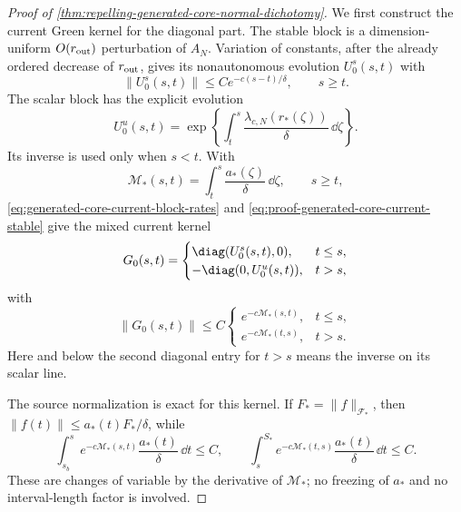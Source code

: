 \begin{proof}[Proof of
\cref{thm:repelling-generated-core-normal-dichotomy}]
We first construct the current Green kernel for the diagonal part.
The stable block is a dimension-uniform \(O(r_{\rm out})\) perturbation
of \(A_N\).  Variation of constants, after the already ordered decrease
of \(r_{\rm out}\), gives its nonautonomous evolution \(U_0^s(s,t)\) with
\begin{equation}
 \|U_0^s(s,t)\|\le Ce^{-c(s-t)/\delta},
 \qquad s\ge t.                                  \label{eq:proof-generated-core-current-stable}
\end{equation}
The scalar block has the explicit evolution
\[
 U_0^u(s,t)
 =\exp\left\{\int_t^s
       \frac{\lambda_{c,N}(r_*(\zeta))}{\delta}\,\dd\zeta\right\}.
\]
Its inverse is used only when \(s<t\).  With
\begin{equation}
 \mathscr M_*(s,t)
 =\int_t^s\frac{a_*(\zeta)}{\delta}\,\dd\zeta,
 \qquad s\ge t,                                  \label{eq:proof-generated-core-uncapped-action}
\end{equation}
\cref{eq:generated-core-current-block-rates} and
\cref{eq:proof-generated-core-current-stable} give the mixed current
kernel
\begin{equation}
 G_0(s,t)=
 \begin{cases}
  \diag(U_0^s(s,t),0),&t\le s,\\
  -\diag(0,U_0^u(s,t)),&t>s,
 \end{cases}                                     \label{eq:proof-generated-core-current-green}
\end{equation}
with
\begin{equation}
 \|G_0(s,t)\|
 \le C
 \begin{cases}
  e^{-c\mathscr M_*(s,t)},&t\le s,\\
  e^{-c\mathscr M_*(t,s)},&t>s.
 \end{cases}                                     \label{eq:proof-generated-core-current-green-bound}
\end{equation}
Here and below the second diagonal entry for \(t>s\) means the inverse
on its scalar line.

The source normalization is exact for this kernel.  If
\(F_*=\|f\|_{\mathcal F_*}\), then
\(\|f(t)\|\le a_*(t)F_*/\delta\), while
\[
 \int_{s_b}^s e^{-c\mathscr M_*(s,t)}
       \frac{a_*(t)}{\delta}\,\dd t\le C,
 \qquad
 \int_s^{S_*}e^{-c\mathscr M_*(t,s)}
       \frac{a_*(t)}{\delta}\,\dd t\le C.
                                                        \label{eq:proof-generated-core-source-integrals}
\]
These are changes of variable by the derivative of
\(\mathscr M_*\); no freezing of \(a_*\) and no interval-length factor
is involved.


\end{proof}
